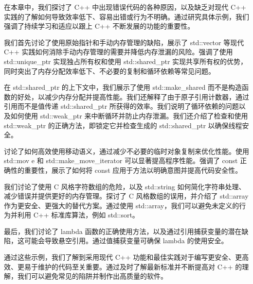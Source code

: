 在本章中，我们探讨了 C++ 中出现错误代码的各种原因，以及缺乏对现代 C++ 实践的了解如何导致效率低下、容易出错或行为不明确。通过研究具体示例，我们强调了持续学习和适应以跟上 C++ 不断发展的功能的重要性。

我们首先讨论了使用原始指针和手动内存管理的缺陷，展示了 std::vector 等现代 C++ 实践如何消除手动内存管理的需要并降低内存泄漏的风险。强调了使用 std::unique\_ptr 实现独占所有权和使用 std::shared\_ptr 实现共享所有权的优势，同时突出了内存分配效率低下、不必要的复制和循环依赖等常见问题。

在 std::shared\_ptr 的上下文中，我们展示了使用 std::make\_shared 而不是构造函数的好处，以减少内存分配并提高性能。我们还解释了由于原子引用计数器，通过引用而不是值传递 std::shared\_ptr 所获得的效率。我们说明了循环依赖的问题以及如何使用 std::weak\_ptr 来中断循环并防止内存泄漏。我们还介绍了检查和使用 std::weak\_ptr 的正确方法，即锁定它并检查生成的 std::shared\_ptr 以确保线程安全。

讨论了如何高效使用移动语义，通过减少不必要的临时对象复制来优化性能。使用 std::mov e 和 std::make\_move\_iterator 可以显著提高程序性能。强调了 const 正确性的重要性，展示了如何将 const 应用于方法以明确意图并提高代码安全性。

我们讨论了使用 C 风格字符数组的危险，以及 std::string 如何简化字符串处理、减少错误并提供更好的内存管理。探讨了 C 风格数组的误用，并介绍了 std::array 作为更安全、更强大的替代方案。通过使用 std::array，我们可以避免未定义的行为并利用 C++ 标准库算法，例如 std::sort。

最后，我们讨论了 lambda 函数的正确使用方法，以及通过引用捕获变量的潜在缺陷，这可能会导致悬空引用。通过值捕获变量可确保 lambda 的使用安全。

通过这些示例，我们了解到采用现代 C++ 功能和最佳实践对于编写更安全、更高效、更易于维护的代码至关重要。通过及时了解最新标准并不断提高对 C++ 的理解，我们可以避免常见的陷阱并制作出高质量的软件。